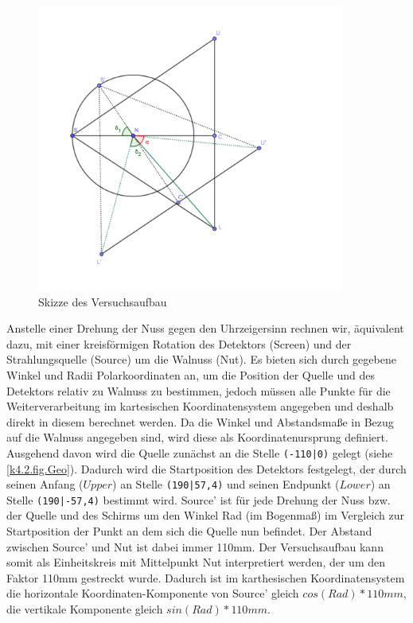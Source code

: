 \begin{figure}
    \centering
    \includegraphics[width=0.9\textwidth]{k4.2/versuchsaufbau-skizze.png}
    \caption{Skizze des Versuchsaufbau}
    \label{k4.2.fig.skizze}
\end{figure}
Anstelle einer Drehung der Nuss gegen den Uhrzeigersinn rechnen wir, äquivalent dazu, mit einer kreisförmigen Rotation des Detektors (Screen) und der Strahlungsquelle (Source) um die Walnuss (Nut). Es bieten sich durch gegebene Winkel und Radii Polarkoordinaten an, um die Position der Quelle und des Detektors relativ zu Walnuss zu bestimmen, jedoch müssen alle Punkte für die Weiterverarbeitung im kartesischen Koordinatensystem angegeben und deshalb direkt in diesem berechnet werden. Da die Winkel und Abstandsmaße in Bezug auf die Walnuss angegeben sind, wird diese als Koordinatenursprung definiert. Ausgehend davon wird die Quelle zunächst an die Stelle \verb+(-110|0)+ gelegt (siehe \cref{k4.2.fig.Geo}). Dadurch wird die Startposition des Detektors festgelegt, der durch seinen Anfang ($Upper$) an Stelle \verb+(190|57,4)+ und seinen Endpunkt ($Lower$) an Stelle \verb+(190|-57,4)+ bestimmt wird. 
Source' ist für jede Drehung der Nuss bzw. der Quelle und des Schirms um den Winkel Rad (im Bogenmaß) im Vergleich zur Startposition der Punkt an dem sich die Quelle nun befindet. Der Abstand zwischen Source' und Nut ist dabei immer 110mm. Der Versuchsaufbau kann somit als Einheitskreis mit Mittelpunkt Nut interpretiert werden, der um den Faktor 110mm gestreckt wurde. Dadurch ist im karthesischen Koordinatensystem die horizontale Koordinaten-Komponente von Source' gleich $cos(Rad) * 110mm$, die vertikale Komponente gleich $sin(Rad) * 110mm$.
